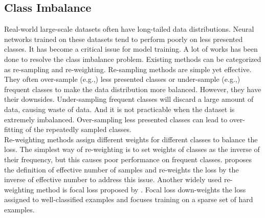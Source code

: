\documentclass[sigconf]{acmart}
\begin{document}
\subsection{Class Imbalance}
Real-world large-scale datasets often have long-tailed data distributions. Neural networks trained on these datasets tend to perform poorly on less presented classes. It has become a critical issue for model training. A lot of works has been done to resolve the class imbalance problem. Existing methods can be categorized as re-sampling \cite{shen16,buda18,geifman17,japkowicz02,zou18} and re-weighting\cite{cui19,ren18,khan17}. Re-sampling methods are simple yet effective. They often over-sample (e.g.,\cite{byrd19,ramentol12}) less presented classes or under-sample (e.g.,\cite{lee16,haixiang17}) frequent classes to make the data distribution more balanced. However, they have their downsides. Under-sampling frequent classes will discard a large amount of data, causing waste of data. And it is not practicable when the dataset is extremely imbalanced. Over-sampling less presented classes can lead to over-fitting of the repeatedly sampled classes.
\\\indent Re-weighting methods assign different weights for different classes to balance the loss. The simplest way of re-weighting is to set weights of classes as the inverse of their frequency\cite{huang16,wang17}, but this causes poor performance on frequent classes. \citet{cui19} proposes the definition of effective number of samples and re-weights the loss by the inverse of effective number to address this issue. Another widely used re-weighting method is focal loss proposed by \citet{lin17}. Focal loss down-weights the loss assigned to well-classified examples and focuses training on a sparse set of hard examples.
\end{document}

